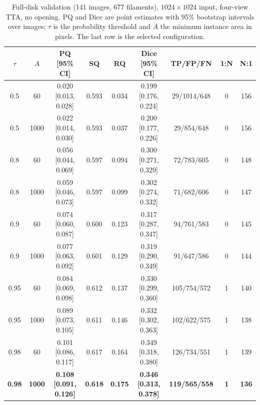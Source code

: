 \documentclass[sigconf]{acmart}
\begin{document}
\begin{table}[t]
    \caption{Full-disk validation (141 images, 677 filaments), $1024\times1024$ input, four-view TTA, no opening. PQ and Dice are point estimates with 95\% bootstrap intervals over images; $\tau$ is the probability threshold and $A$ the minimum instance area in pixels. The last row is the selected configuration.}
    \label{tab:val}
    \centering
    \small
    \begin{tabular}{ccccccccc}
        \toprule
        $\tau$ & $A$ & PQ [95\% CI] & SQ & RQ & Dice [95\% CI] & TP/FP/FN & 1:N & N:1 \\
        \midrule
        0.5 & 60 & 0.020 [0.013, 0.028] & 0.593 & 0.034 & 0.199 [0.176, 0.224] & 29/1014/648 & 0 & 156 \\
        0.5 & 1000 & 0.022 [0.014, 0.030] & 0.593 & 0.037 & 0.200 [0.177, 0.226] & 29/854/648 & 0 & 156 \\
        0.8 & 60 & 0.056 [0.044, 0.069] & 0.597 & 0.094 & 0.300 [0.271, 0.329] & 72/783/605 & 0 & 148 \\
        0.8 & 1000 & 0.059 [0.046, 0.073] & 0.597 & 0.099 & 0.302 [0.274, 0.332] & 71/682/606 & 0 & 147 \\
        0.9 & 60 & 0.074 [0.060, 0.087] & 0.600 & 0.123 & 0.317 [0.287, 0.347] & 94/761/583 & 0 & 145 \\
        0.9 & 1000 & 0.077 [0.063, 0.092] & 0.601 & 0.129 & 0.319 [0.290, 0.349] & 91/647/586 & 0 & 144 \\
        0.95 & 60 & 0.084 [0.069, 0.098] & 0.612 & 0.137 & 0.330 [0.299, 0.360] & 105/754/572 & 1 & 140 \\
        0.95 & 1000 & 0.089 [0.073, 0.105] & 0.611 & 0.146 & 0.332 [0.302, 0.363] & 102/622/575 & 1 & 138 \\
        0.98 & 60 & 0.101 [0.086, 0.117] & 0.617 & 0.164 & 0.349 [0.318, 0.380] & 126/734/551 & 1 & 139 \\
        \textbf{0.98} & \textbf{1000} & \textbf{0.108 [0.091, 0.126]} & \textbf{0.618} & \textbf{0.175} & \textbf{0.346 [0.313, 0.378]} & \textbf{119/565/558} & \textbf{1} & \textbf{136} \\
        \bottomrule
    \end{tabular}
\end{table}
\end{document}
